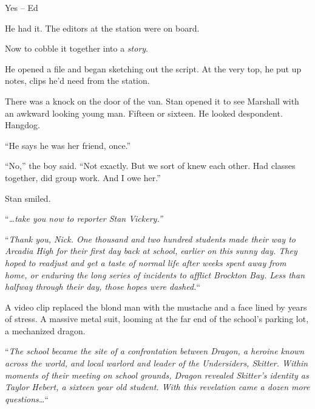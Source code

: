 Yes – Ed



He had it.  The editors at the station were on board.



Now to cobble it together into a \emph{story}.



He opened a file and began sketching out the script.  At the very top, he put up notes, clips he'd need from the station.



There was a knock on the door of the van.  Stan opened it to see Marshall with an awkward looking young man.  Fifteen or sixteen.  He looked despondent.  Hangdog.



``He says he was her friend, once.''



``No,'' the boy said.  ``Not exactly.  But we sort of knew each other.  Had classes together, did group work.  And I owe her.''



Stan smiled.



\sectionbreak



``\emph{\ldots{}take you now to reporter Stan Vickery.''}



``\emph{Thank you, Nick.  One thousand and two hundred students made their way to Arcadia High for their first day back at school, earlier on this sunny day.  They hoped to readjust and get a taste of normal life after weeks spent away from home, or enduring the long series of incidents to afflict Brockton Bay.  Less than halfway through their day, those hopes were dashed.}``



A video clip replaced the blond man with the mustache and a face lined by years of stress.  A massive metal suit, looming at the far end of the school's parking lot, a mechanized dragon.



``\emph{The school became the site of a confrontation between Dragon, a heroine known across the world, and local warlord and leader of the Undersiders, Skitter.  Within moments of their meeting on school grounds, Dragon revealed Skitter's identity as Taylor Hebert, a sixteen year old student.  With this revelation came a dozen more questions\ldots}``



